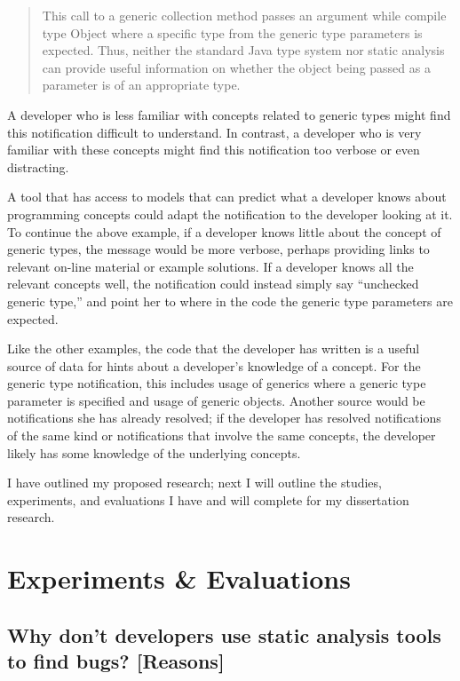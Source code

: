 \documentclass{llncs}
\begin{document}
\vspace*{-1ex}
\begin{quotation}
	\noindent \small{
		This call to a generic collection method passes an argument while compile type Object where a specific type from the generic type parameters is expected. Thus, neither the standard Java type system nor static analysis can provide useful information on whether the object being passed as a parameter is of an appropriate type.}
\end{quotation}
\vspace*{-1ex}

\noindent
A developer who is less familiar with concepts related to generic types might find this notification difficult to understand. 
In contrast, a developer who is very familiar with these concepts might find this notification too verbose or even distracting.

A tool that has access to models that can predict what a developer knows about programming concepts could adapt the notification to the developer looking at it.
To continue the above example, if a developer knows little about the concept of generic types, the message would be more verbose, perhaps providing links to 
relevant on-line material or example solutions.
If a developer knows all the relevant concepts well, the notification could instead simply say ``unchecked generic type,'' and point her to where in the code the generic type parameters are expected.

Like the other examples, the code that the developer has written is a useful source of data for hints about a developer's knowledge of a concept.
For the generic type notification, this includes usage of generics where a generic type parameter is specified and usage of generic objects.
Another source would be notifications she has already resolved; if the developer has resolved notifications of the same kind or notifications that involve the same concepts,
the developer likely has some knowledge of the underlying concepts.

I have outlined my proposed research; next I will outline the studies, experiments, and evaluations I have and will complete for my dissertation research.

\section{Experiments \& Evaluations}\label{sec:eval}
\subsection{Why don't developers use static analysis tools to find bugs? [Reasons]}\label{subsec:s1}
\end{document}

